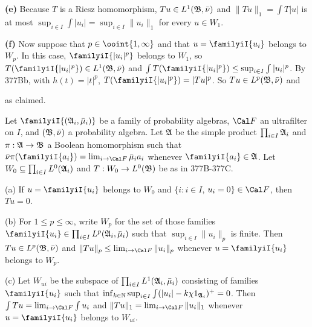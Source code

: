 {\medskip

{\bf (e)} Because $T$ is a Riesz homomorphism, $Tu\in L^1(\frak B,\bar\nu)$
and $\|Tu\|_1=\int T|u|$ is at most
$\sup_{i\in I}\int|u_i|=\sup_{i\in I}\|u_i\|_1$ for every $u\in W_1$.

\medskip

{\bf (f)} Now suppose that $p\in\ooint{1,\infty}$ and that
$u=\familyiI{u_i}$ belongs to $W_p$.   In this case, $\familyiI{|u_i|^p}$
belongs to $W_1$, so $T(\familyiI{|u_i|^p})\in L^1(\frak B,\bar\nu)$ and
$\int T(\familyiI{|u_i|^p})\le\sup_{i\in I}\int|u_i|^p$.   By 377Bb,
with $h(t)=|t|^p$, $T(\familyiI{|u_i|^p})=|Tu|^p$.   So
$Tu\in L^p(\frak B,\bar\nu)$ and


\noindent as claimed.
}%

 Let $\familyiI{(\frak A_i,\bar\mu_i)}$ be a
family of probability algebras, $\Cal F$ an ultrafilter on $I$,
and $(\frak B,\bar\nu)$ a probability
algebra.   Let $\frak A$ be the simple product $\prod_{i\in I}\frak A_i$
and $\pi:\frak A\to\frak B$ a Boolean homomorphism such that
$\bar\nu\pi(\familyiI{a_i})=\lim_{i\to\Cal F}\bar\mu_ia_i$
whenever $\familyiI{a_i}\in\frak A$.   Let
$W_0\subseteq\prod_{i\in I}L^0(\frak A_i)$ and $T:W_0\to L^0(\frak B)$ be
as in 377B-377C.

(a) If $u=\familyiI{u_i}$ belongs to $W_0$ and $\{i:i\in I$, $u_i=0\}\in\Cal F$, then
$Tu=0$.

(b) For $1\le p\le\infty$, write $W_p$ for the set of those families
$\familyiI{u_i}\in\prod_{i\in I}L^p(\frak A_i,\bar\mu_i)$ such that
$\sup_{i\in I}\|u_i\|_p$ is finite.   Then $Tu\in L^p(\frak B,\bar\nu)$
and $\|Tu\|_p\le\lim_{i\to\Cal F}\|u_i\|_p$ whenever
$u=\familyiI{u_i}$ belongs to $W_p$.

(c) Let $W_{ui}$ be the subspace of
$\prod_{i\in I}L^1(\frak A_i,\bar\mu_i)$
consisting of families $\familyiI{u_i}$ such
that $\inf_{k\in\Bbb N}\sup_{i\in I}\int(|u_i|-k\chi 1_{\frak A_i})^+=0$.
Then $\int Tu=\lim_{i\to\Cal F}\int u_i$ and
$\|Tu\|_1=\lim_{i\to\Cal F}\|u_i\|_1$
whenever $u=\familyiI{u_i}$ belongs to $W_{ui}$.

